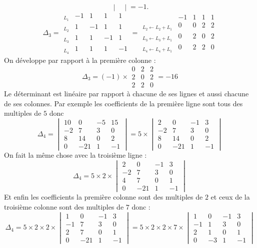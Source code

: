 {{$$\begin{vmatrix}
\end{vmatrix}
= -1.$$
$$\Delta_3 = 
\begin{array}{l|cccc|} 
_{L_1} & -1 & 1 & 1 & 1 \\ _{L_2} & 1 & -1 & 1 & 1\\ _{L_3} & 1 & 1 & -1& 1\\ _{L_4} & 1 & 1& 1&-1
\end{array}
= \begin{array}{l|cccc|} 
 & -1 & 1 & 1 & 1 \\ _{L_2\leftarrow L_2+L_1} & 0 & 0 & 2 & 2\\
 _{L_3\leftarrow L_3+L_1} & 0 & 2 & 0 & 2 \\  _{L_4\leftarrow L_4+L_1} &0 & 2 & 2 & 0
\end{array}
$$
On développe par rapport à la première colonne :
$$\Delta_3 = (-1) \times \begin{array}{|ccc|} 
  0 & 2 & 2\\  2 & 0 & 2 \\  2 & 2 & 0
\end{array} = -16$$
Le déterminant est linéaire par rapport à chacune de ses lignes
et aussi chacune de ses colonnes. 
Par exemple les coefficients de la première ligne sont tous des multiples
de $5$ donc 
$$\Delta_4 = 
\begin{vmatrix}
10 & 0 & -5 & 15 \\ -2 & 7 & 3 & 0 \\ 8 & 14 & 0 & 2 \\ 0 & -21 & 1 & -1
\end{vmatrix}
= 5 \times \begin{vmatrix}
2 & 0 & -1 & 3 \\ -2 & 7 & 3 & 0 \\ 8 & 14 & 0 & 2 \\ 0 & -21 & 1 & -1
\end{vmatrix}
$$
On fait la même chose avec la troisième ligne :
$$\Delta_4 = 5 \times 2 \times \begin{vmatrix}
2 & 0 & -1 & 3 \\ -2 & 7 & 3 & 0 \\ 4 & 7 & 0 & 1 \\ 0 & -21 & 1 & -1
\end{vmatrix}
$$
Et enfin les coefficients la première colonne sont des multiples de $2$ et 
ceux de la troisième colonne sont des multiples de $7$ donc :
$$\Delta_4 = 5 \times 2 \times 2 \times\begin{vmatrix}
1 & 0 & -1 & 3 \\ -1 & 7 & 3 & 0 \\ 2 & 7 & 0 & 1 \\ 0 & -21 & 1 & -1
\end{vmatrix}
= 5 \times 2 \times 2 \times 7  \times
\begin{vmatrix}
1 & 0 & -1 & 3 \\ -1 & 1 & 3 & 0 \\ 2 & 1 & 0 & 1 \\ 0 & -3 & 1 & -1
\end{vmatrix}
$$

}}
